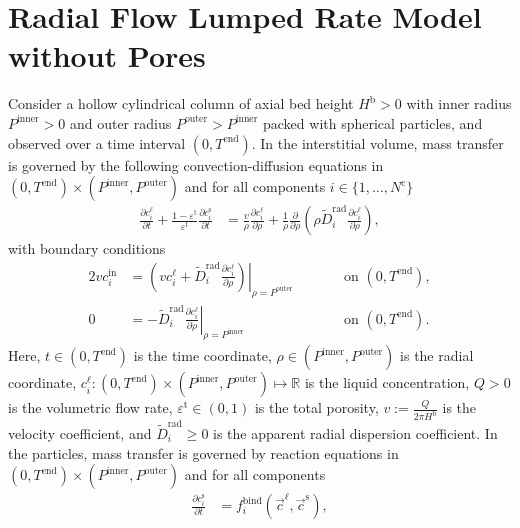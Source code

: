 \documentclass{article}
\begin{document}
\section*{Radial Flow Lumped Rate Model without Pores}
Consider a hollow cylindrical column of axial bed height $H^{\mathrm{b}} > 0$ with inner radius $P^{\mathrm{inner}} > 0$ and outer radius $P^{\mathrm{outer}} > P^{\mathrm{inner}}$ packed with spherical particles, and observed over a time interval $(0, T^{\mathrm{end}})$.
In the interstitial volume, mass transfer is governed by the following convection-diffusion equations in $(0, T^{\mathrm{end}})\times (P^{\mathrm{inner}}, P^{\mathrm{outer}})$ and for all components $i\in\{1, \dots, N^{\mathrm{c}} \}$
\begin{align}
    \frac{\partial c^{\mathrm{\ell}}_{i}}{\partial t}
        + \frac{1 - \varepsilon^{\mathrm{t}}}{\varepsilon^{\mathrm{t}}} \frac{\partial c^{\mathrm{s}}_{i}}{\partial t}
    &= \frac{v}{\rho} \frac{\partial c^{\mathrm{\ell}}_{i}}{\partial \rho}
        + \frac{1}{\rho} \frac{\partial}{\partial \rho} \left( \rho \tilde{D}^{\mathrm{rad}}_{i} \frac{\partial c^{\mathrm{\ell}}_{i}}{\partial \rho} \right),
\end{align}
with boundary conditions
\begin{alignat}{2}
    v c^{\mathrm{in}}_{i}
    &= \left.\left( v c^{\mathrm{\ell}}_{i} + \tilde{D}^{\mathrm{rad}}_{i} \frac{\partial c^{\mathrm{\ell}}_{i}}{\partial \rho}\right)\right|_{\rho=P^{\mathrm{outer}}}
    & & \qquad\text{on }(0, T^{\mathrm{end}}),
    \\
    0
    &= - \tilde{D}^{\mathrm{rad}}_{i} \left. \frac{\partial c^{\mathrm{\ell}}_{i}}{\partial \rho} \right|_{\rho=P^{\mathrm{inner}}}
    & & \qquad\text{on }(0, T^{\mathrm{end}}).
\end{alignat}
Here, $t\in (0, T^{\mathrm{end}})$ is the time coordinate, $\rho\in (P^{\mathrm{inner}}, P^{\mathrm{outer}})$ is the radial coordinate, $c^{\mathrm{\ell}}_{i}\colon (0, T^{\mathrm{end}})\times (P^{\mathrm{inner}}, P^{\mathrm{outer}}) \mapsto \mathbb{R}$ is the liquid concentration, $Q> 0$ is the volumetric flow rate, $\varepsilon^{\mathrm{t}}\in (0, 1)$ is the total porosity, $v:= \frac{Q}{2 \pi H^{\mathrm{b}}}$ is the velocity coefficient, and $\tilde{D}^{\mathrm{rad}}_{i}\geq 0$ is the apparent radial dispersion coefficient.
In the particles, mass transfer is governed by reaction equations in $(0, T^{\mathrm{end}}) \times (P^{\mathrm{inner}}, P^{\mathrm{outer}})$ and for all components
\begin{align}
    \frac{\partial c^{\mathrm{s}}_{i}}{\partial t}
    &= f^{\mathrm{bind}}_{i}\left( \vec{c}^{\mathrm{\ell}}, \vec{c}^{\mathrm{s}} \right),
\end{align}
\end{document}

